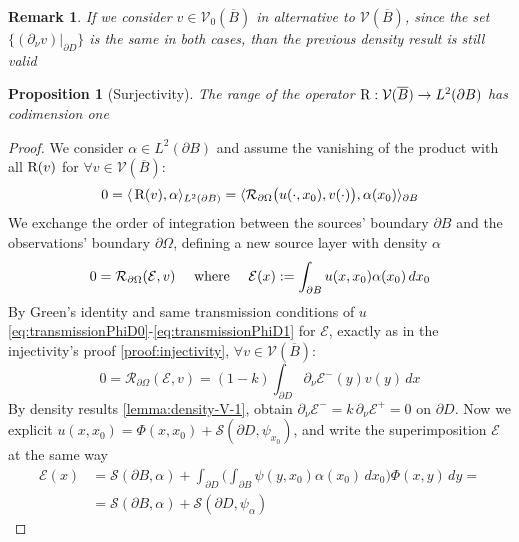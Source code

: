 \documentclass[10pt, a4paper, twoside, openright]{book}
\theoremstyle{definition}
\theoremstyle{plain}
\theoremstyle{plain}
\theoremstyle{plain}
\newtheorem{proposition}[subsection]{Proposition}
\theoremstyle{plain}
\newtheorem{remark}[subsection]{Remark}
\theoremstyle{plain}
\theoremstyle{plain}
\theoremstyle{plain}
\theoremstyle{plain}
\begin{document}
\begin{remark}
 If we consider $v\in\mathcal{V}_0(\overline{B})$ in alternative to $\mathcal{V}(\overline{B})$,  since the set $\{(\partial_\nu v )|_{\partial D}\}$ is the same in both cases, than the previous density result is still valid
\end{remark}
\begin{proposition}[Surjectivity]
\label{prop:surjectivity}
 The range of the operator $\textup{R} : \mathcal{V}(\overline{B})\to L^2(\partial B)$  has codimension one
\end{proposition}
\begin{proof}
\label{proof:surjectivity}
 We consider $\alpha\in L^2(\partial B)$ and assume the vanishing of the product with all $\textup{R}(v)$ for $\forall v\in\mathcal{V}(\overline{B})$:
 \begin{equation*}
  0 =\langle\,\textup{R}(v), \alpha\rangle_{L^2(\partial B)} = \langle \mathcal{R}_{\partial\Omega}\bigl(u(\cdot,x_0),v(\cdot)\bigr), \alpha(x_0)\rangle_{\partial B}
 \end{equation*}
 We exchange the order of integration between the sources' boundary $\partial B$ and the observations' boundary $\partial \Omega$, defining a new source layer with density $\alpha$ 
 \begin{equation}
  0 = \mathcal{R}_{\partial \Omega}(\mathcal{E},v)\quad\textup{ where }\quad\mathcal{E}(x):=\int_{\partial B}u(x,x_0)\alpha(x_0)\, dx_0
 \end{equation}
 By Green's identity and same transmission conditions of $u$ \ref{eq:transmissionPhiD0}-\ref{eq:transmissionPhiD1} for $\mathcal{E}$, exactly as in the injectivity's proof \ref{proof:injectivity}, $\forall v \in \mathcal{V}(\overline{B})$:
 \begin{equation}
  0 = \mathcal{R}_{\partial \Omega}(\mathcal{E},v)=(1-k)\int_{\partial D} \partial_\nu\mathcal{E}^-(y)v(y)\,dx
 \end{equation}
 By density results \ref{lemma:density-V-1}, obtain $\partial_\nu\mathcal{E}^- = k\,\partial_\nu\mathcal{E}^+= 0$ on $\partial D$. 
 Now we explicit $u(x,x_0)=\Phi(x,x_0)+\mathcal{S}(\partial D, \psi_{x_0})$, and write the superimposition $\mathcal{E}$ at the same way
 \begin{align}
  \mathcal{E}(x)&=\mathcal{S}(\partial B, \alpha) + \int_{\partial D} \Big(\int_{\partial B}\psi(y,x_0)\alpha(x_0)\,dx_0\Big)\Phi(x,y)\,dy = \\
  &=\mathcal{S}(\partial B, \alpha) + \mathcal{S}(\partial D, \psi_\alpha)
 \end{align}

\end{proof}
\end{document}
